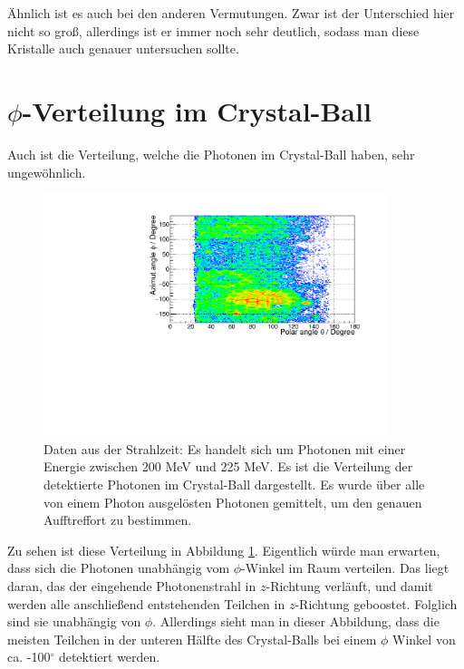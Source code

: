 \documentclass[a4paper,11pt,oneside,final,german,openbib,pdftex]{scrbook}
\begin{document}
{ \"Ahnlich ist es auch bei den anderen Vermutungen. Zwar ist der Unterschied hier nicht so gro{\ss}, allerdings ist er immer noch sehr deutlich, sodass man diese Kristalle auch genauer untersuchen sollte.
 \newpage

\section{$\phi$-Verteilung im Crystal-Ball}

Auch ist die Verteilung, welche die Photonen im Crystal-Ball haben, sehr ungew\"ohnlich.

\begin{figure}[h!]
	\begin{center}
		\includegraphics[width=100mm]{NewCalib/ThetaPhiVerteilung/20172404ThetaPhi200MeVBeam}
		\caption[Strahlzeit: Verteilung der detektierten Photonen im CB]{Daten aus der Strahlzeit: Es handelt sich um Photonen mit einer Energie zwischen 200 MeV und 225 MeV. Es ist die Verteilung der detektierte Photonen im Crystal-Ball dargestellt. Es wurde \"uber alle von einem Photon ausgel\"osten Photonen gemittelt, um den genauen Aufftreffort zu bestimmen.}
		\label{fig:Verteilung-der-Photonen-im-CB}
	\end{center}
\end{figure}
Zu sehen ist diese Verteilung in Abbildung \ref{fig:Verteilung-der-Photonen-im-CB}. Eigentlich w\"urde man erwarten, dass sich die Photonen unabh\"angig vom $\phi$-Winkel im Raum verteilen. Das liegt daran, das der eingehende Photonenstrahl in $z$-Richtung verl\"auft, und damit werden alle anschlie{\ss}end entstehenden Teilchen in $z$-Richtung geboostet. Folglich sind sie unabh\"angig von $\phi$. 
Allerdings sieht man in dieser Abbildung, dass die meisten Teilchen in der unteren H\"alfte des Crystal-Balls bei einem $\phi$ Winkel von ca. -100$^{\circ}$ detektiert werden.

}
\end{document}
